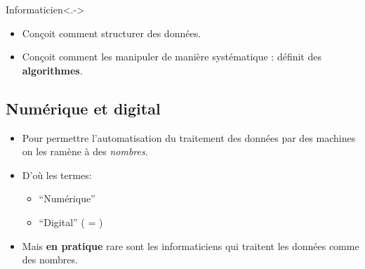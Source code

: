 \documentclass{beamer}
\newcommand{\forme}[1]{\enquote{#1}}
\begin{document}
\begin{slide}
	\begin{block}{Informaticien}<.->
		\begin{itemize}
			\item Conçoit comment structurer des données.
			\item Conçoit comment les manipuler de manière systématique : définit des \textbf{algorithmes}.
		\end{itemize}
	\end{block}
\end{slide}
\subsection{Numérique et digital}

\begin{frame}

	\begin{itemize}
		\item Pour permettre l'automatisation du traitement des données par des machines on les ramène à des \emph{nombres}.
		\item D'où les termes:
			\begin{itemize}
				\item \forme{Numérique}
				\item \forme{Digital} ( = )
			\end{itemize}
		\item Mais \textbf{en pratique} rare sont les informaticiens qui traitent les données comme des nombres. 
	\end{itemize}
\end{frame}
\end{document}
